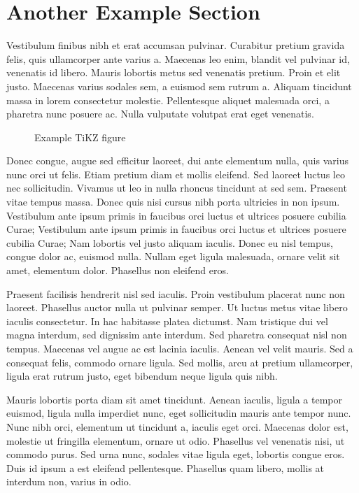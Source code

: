 \section{Another Example Section}
\label{sec:tikz}

Vestibulum finibus nibh et erat accumsan pulvinar.
Curabitur pretium gravida felis, quis ullamcorper ante varius a.
Maecenas leo enim, blandit vel pulvinar id, venenatis id libero.
Mauris lobortis metus sed venenatis pretium.
Proin et elit justo.
Maecenas varius sodales sem, a euismod sem rutrum a.
Aliquam tincidunt massa in lorem consectetur molestie.
Pellentesque aliquet malesuada orci, a pharetra nunc posuere ac.
Nulla vulputate volutpat erat eget venenatis.

\begin{figure}[htbp]
  \centering
  
  \caption{Example TiKZ figure}
  \label{fig:tikz}
\end{figure}

Donec congue, augue sed efficitur laoreet, dui ante elementum nulla, quis varius nunc orci ut felis.
Etiam pretium diam et mollis eleifend.
Sed laoreet luctus leo nec sollicitudin.
Vivamus ut leo in nulla rhoncus tincidunt at sed sem.
Praesent vitae tempus massa.
Donec quis nisi cursus nibh porta ultricies in non ipsum.
Vestibulum ante ipsum primis in faucibus orci luctus et ultrices posuere cubilia Curae; Vestibulum ante ipsum primis in faucibus orci luctus et ultrices posuere cubilia Curae; Nam lobortis vel justo aliquam iaculis.
Donec eu nisl tempus, congue dolor ac, euismod nulla.
Nullam eget ligula malesuada, ornare velit sit amet, elementum dolor.
Phasellus non eleifend eros.


Praesent facilisis hendrerit nisl sed iaculis.
Proin vestibulum placerat nunc non laoreet.
Phasellus auctor nulla ut pulvinar semper.
Ut luctus metus vitae libero iaculis consectetur.
In hac habitasse platea dictumst.
Nam tristique dui vel magna interdum, sed dignissim ante interdum.
Sed pharetra consequat nisl non tempus.
Maecenas vel augue ac est lacinia iaculis.
Aenean vel velit mauris.
Sed a consequat felis, commodo ornare ligula.
Sed mollis, arcu at pretium ullamcorper, ligula erat rutrum justo, eget bibendum neque ligula quis nibh.


Mauris lobortis porta diam sit amet tincidunt.
Aenean iaculis, ligula a tempor euismod, ligula nulla imperdiet nunc, eget sollicitudin mauris ante tempor nunc.
Nunc nibh orci, elementum ut tincidunt a, iaculis eget orci.
Maecenas dolor est, molestie ut fringilla elementum, ornare ut odio.
Phasellus vel venenatis nisi, ut commodo purus.
Sed urna nunc, sodales vitae ligula eget, lobortis congue eros.
Duis id ipsum a est eleifend pellentesque.
Phasellus quam libero, mollis at interdum non, varius in odio.
